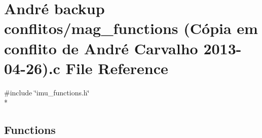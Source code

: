 \hypertarget{mag__functions_01_07C_xC3_xB3pia_01em_01conflito_01de_01Andr_xC3_xA9_01Carvalho_012013-04-26_08_8c}{\section{André backup conflitos/mag\-\_\-functions (Cópia em conflito de André Carvalho 2013-\/04-\/26).c File Reference}
\label{mag__functions_01_07C_xC3_xB3pia_01em_01conflito_01de_01Andr_xC3_xA9_01Carvalho_012013-04-26_08_8c}
}
{\ttfamily \#include \char`\"{}imu\-\_\-functions.\-h\char`\"{}}\\*
\subsection*{Functions}
